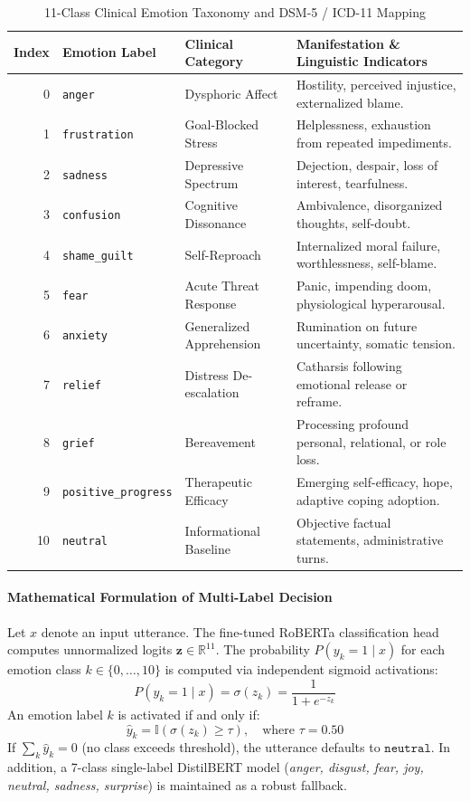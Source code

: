 \documentclass[11pt,a4paper]{article}
\begin{document}
\begin{table}[H]
\centering
\small
\sffamily
\caption{11-Class Clinical Emotion Taxonomy and DSM-5 / ICD-11 Mapping}
\label{tab:emotion_tax}
\begin{tabularx}{\linewidth}{rllX}
\toprule
\textbf{Index} & \textbf{Emotion Label} & \textbf{Clinical Category} & \textbf{Manifestation \& Linguistic Indicators} \\
\midrule
0 & \texttt{anger} & Dysphoric Affect & Hostility, perceived injustice, externalized blame. \\
1 & \texttt{frustration} & Goal-Blocked Stress & Helplessness, exhaustion from repeated impediments. \\
2 & \texttt{sadness} & Depressive Spectrum & Dejection, despair, loss of interest, tearfulness. \\
3 & \texttt{confusion} & Cognitive Dissonance & Ambivalence, disorganized thoughts, self-doubt. \\
4 & \texttt{shame\_guilt} & Self-Reproach & Internalized moral failure, worthlessness, self-blame. \\
5 & \texttt{fear} & Acute Threat Response & Panic, impending doom, physiological hyperarousal. \\
6 & \texttt{anxiety} & Generalized Apprehension & Rumination on future uncertainty, somatic tension. \\
7 & \texttt{relief} & Distress De-escalation & Catharsis following emotional release or reframe. \\
8 & \texttt{grief} & Bereavement & Processing profound personal, relational, or role loss. \\
9 & \texttt{positive\_progress} & Therapeutic Efficacy & Emerging self-efficacy, hope, adaptive coping adoption. \\
10 & \texttt{neutral} & Informational Baseline & Objective factual statements, administrative turns. \\
\bottomrule
\end{tabularx}
\end{table}

\paragraph{Mathematical Formulation of Multi-Label Decision}
Let $x$ denote an input utterance. The fine-tuned RoBERTa classification head computes unnormalized logits $\mathbf{z} \in \mathbb{R}^{11}$. The probability $P(y_k = 1 \mid x)$ for each emotion class $k \in \{0, \dots, 10\}$ is computed via independent sigmoid activations:
\begin{equation}
  P(y_k = 1 \mid x) = \sigma(z_k) = \frac{1}{1 + e^{-z_k}}
\end{equation}
An emotion label $k$ is activated if and only if:
\begin{equation}
  \hat{y}_k = \mathbb{I}\left( \sigma(z_k) \ge \tau \right), \quad \text{where } \tau = 0.50
\end{equation}
If $\sum_k \hat{y}_k = 0$ (no class exceeds threshold), the utterance defaults to $\texttt{neutral}$. In addition, a 7-class single-label DistilBERT model (\textit{anger, disgust, fear, joy, neutral, sadness, surprise}) is maintained as a robust fallback.
\end{document}
